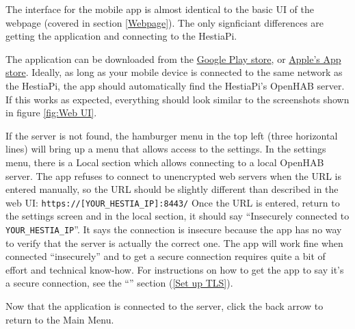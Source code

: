 The interface for the mobile app is almost identical to the basic UI of the
webpage (covered in section \ref{Webpage}).  The only signficiant differences
are getting the application and connecting to the HestiaPi.

The application can be downloaded from the
\href{https://play.google.com/store/apps/details?id=org.openhab.habdroid&hl=en_US}
{Google Play store}, or \href{https://apps.apple.com/us/app/openhab/id492054521}
{Apple's App store}.  Ideally, as long as your mobile device is connected to
the same network as the HestiaPi, the app should automatically find the
HestiaPi's OpenHAB server.  If this works as expected, everything should look
similar to the screenshots shown in figure \ref{fig:Web UI}.

If the server is not found, the hamburger menu in the top left (three
horizontal lines) will bring up a menu that allows access to the settings.  In
the settings menu, there is a Local section which allows connecting to a local
OpenHAB server.  The app refuses to connect to unencrypted web servers when the
URL is entered manually, so the URL should be slightly different than described
in the web UI: \texttt{https://[YOUR\_HESTIA\_IP]:8443/}  Once the URL is
entered, return to the settings screen and in the local section, it should say
``Insecurely connected to \texttt{YOUR\_HESTIA\_IP}''.  It says the connection
is insecure because the app has no way to verify that the server is actually
the correct one.  The app will work fine when connected ``insecurely'' and to
get a secure connection requires quite a bit of effort and technical know-how.
For instructions on how to get the app to say it's a secure connection, see
the ``'' section (\ref{Set up TLS}).

Now that the application is connected to the server, click the back arrow to
return to the Main Menu.
